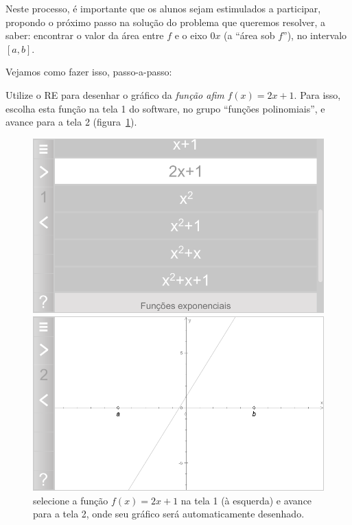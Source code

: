 \documentclass[a4paper,12pt]{scrartcl}
\begin{document}
    Neste processo, é importante que os alunos sejam estimulados a participar, propondo o próximo passo na solução do problema que queremos resolver, a saber: encontrar o valor da área entre $f$ e o eixo $0x$ (a ``área sob $f$''), no intervalo $[a,b]$.
    
    Vejamos como fazer isso, passo-a-passo:
  
    \begin{compactenum}
  
      \item Utilize o RE para desenhar o gráfico da \emph{função afim} $f(x) = 2x + 1$. Para isso, escolha esta função na tela 1 do software, no grupo ``funções polinomiais'', e avance para a tela 2 (figura~\ref{fig:f}).
            
      \begin{figure}
	\begin{minipage}[t]{0.49\textwidth}
	  \includegraphics[width=\textwidth]{f.png}	  
	\end{minipage}
	\hfill
	\begin{minipage}[t]{0.49\textwidth}
	  \includegraphics[width=\textwidth]{grafico-f.png}
	\end{minipage}
	\caption{selecione a função $f(x) = 2x + 1$ na tela 1 (à esquerda) e avance para a tela 2, onde seu gráfico será automaticamente desenhado.}
	\label{fig:f}
      \end{figure}
      

\end{compactenum}
\end{document}
